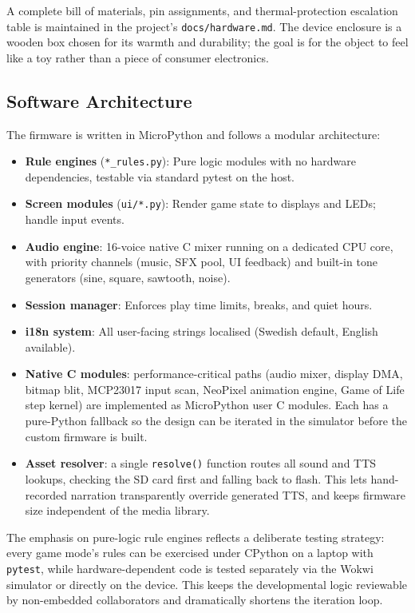 \documentclass[12pt, a4paper]{article}
\begin{document}
A complete bill of materials, pin assignments, and thermal-protection
escalation table is maintained in the project's \texttt{docs/hardware.md}.
The device enclosure is a wooden box chosen for its warmth and durability;
the goal is for the object to feel like a toy rather than a piece of
consumer electronics.

\subsection{Software Architecture}
\label{sec:software}

The firmware is written in MicroPython and follows a modular architecture:

\begin{itemize}[noitemsep]
  \item \textbf{Rule engines} (\texttt{*\_rules.py}): Pure logic modules with
    no hardware dependencies, testable via standard pytest on the host.
  \item \textbf{Screen modules} (\texttt{ui/*.py}): Render game state to
    displays and LEDs; handle input events.
  \item \textbf{Audio engine}: 16-voice native C mixer running on a dedicated
    CPU core, with priority channels (music, SFX pool, UI feedback) and
    built-in tone generators (sine, square, sawtooth, noise).
  \item \textbf{Session manager}: Enforces play time limits, breaks, and
    quiet hours.
  \item \textbf{i18n system}: All user-facing strings localised
    (Swedish default, English available).
  \item \textbf{Native C modules}: performance-critical paths (audio mixer,
    display DMA, bitmap blit, MCP23017 input scan, NeoPixel animation
    engine, Game of Life step kernel) are implemented as MicroPython user
    C modules. Each has a pure-Python fallback so the design can be
    iterated in the simulator before the custom firmware is built.
  \item \textbf{Asset resolver}: a single \texttt{resolve()} function routes
    all sound and TTS lookups, checking the SD card first and falling back
    to flash. This lets hand-recorded narration transparently override
    generated TTS, and keeps firmware size independent of the media
    library.
\end{itemize}

The emphasis on pure-logic rule engines reflects a deliberate testing
strategy: every game mode's rules can be exercised under CPython on a
laptop with \texttt{pytest}, while hardware-dependent code is tested
separately via the Wokwi simulator or directly on the device. This keeps
the developmental logic reviewable by non-embedded collaborators and
dramatically shortens the iteration loop.
\end{document}
